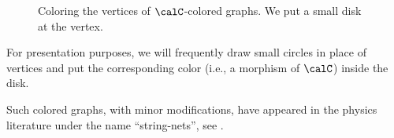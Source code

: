 \begin{figure} [ht]
\centering
  \caption{Coloring the vertices of $\calC$-colored graphs.
  We put a small disk at the vertex.}
  \label{f:graphical-morphism3}
\end{figure}

For presentation purposes, we will frequently draw small circles in place of
vertices and put the corresponding color (i.e., a morphism of $\calC$) inside
the disk.

Such colored graphs, with minor modifications, have appeared in the physics
literature under the name ``string-nets'', see .


